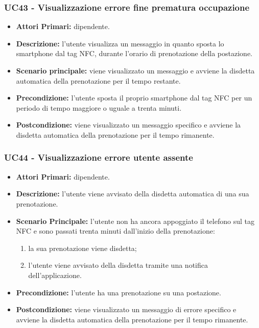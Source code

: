 \subsubsection{ UC43 - Visualizzazione errore fine prematura occupazione}
\begin{itemize}
	\item\textbf{Attori Primari:} dipendente.
	\item\textbf{Descrizione:} l’utente visualizza un messaggio in quanto sposta lo smartphone dal tag NFC, durante l'orario di prenotazione della postazione.
	\item\textbf{Scenario principale:} viene visualizzato un messaggio e avviene la disdetta automatica della prenotazione per il tempo restante.
	\item\textbf{Precondizione:} l’utente sposta il proprio smartphone dal tag NFC per un periodo di tempo maggiore o uguale a trenta minuti.
	\item\textbf{Postcondizione:} viene visualizzato un messaggio specifico e avviene la disdetta automatica della prenotazione per il tempo rimanente.
\end{itemize}

\subsubsection{ UC44 - Visualizzazione errore utente assente }
\begin{itemize}
	\item\textbf{Attori Primari:} dipendente.
	\item\textbf{Descrizione:} l'utente viene avvisato della disdetta automatica di una sua prenotazione.
	\item\textbf{Scenario Principale:} l'utente non ha ancora appoggiato il telefono sul tag NFC e sono passati trenta minuti dall'inizio della prenotazione:
	\begin{enumerate}
		\item la sua prenotazione viene disdetta;
		\item l'utente viene avvisato della disdetta tramite una notifica dell'applicazione.
	\end{enumerate}
	\item\textbf{Precondizione:} l'utente ha una prenotazione su una postazione.
	\item\textbf{Postcondizione:} viene visualizzato un messaggio di errore specifico e avviene la disdetta automatica della prenotazione per il tempo rimanente.
\end{itemize}

